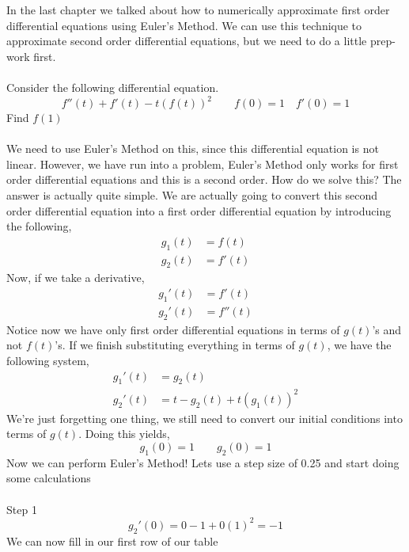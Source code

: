 \documentclass[10pt,reqno]{book}
\theoremstyle{definition}
\begin{document}
	In the last chapter we talked about how to numerically approximate first order differential equations using Euler's Method. We can use this technique to approximate second order differential equations, but we need to do a little prep-work first.\\ \\
	Consider the following differential equation.
	\[ f''(t) + f'(t) - t(f(t))^2 \qquad f(0)=1 \quad f'(0)=1 \]
	Find $ f(1) $\\ \\
	We need to use Euler's Method on this, since this differential equation is not linear. However, we have run into a problem, Euler's Method only works for first order differential equations and this is a second order. How do we solve this? The answer is actually quite simple. We are actually going to convert this second order differential equation into a first order differential equation by introducing the following,
	\begin{align*}
		g_1(t) &= f(t)\\
		g_2(t) &= f'(t)
	\end{align*}
	Now, if we take a derivative,
	\begin{align*}
		g_1'(t) &= f'(t)\\
		g_2'(t) &= f''(t)
	\end{align*}
	Notice now we have only first order differential equations in terms of $ g(t) $'s and not $ f(t) $'s. If we finish substituting everything in terms of $ g(t) $, we have the following system,
	\begin{align*}
		g_1'(t) &= g_2(t)\\
		g_2'(t) &= t - g_2(t) + t(g_1(t))^2
	\end{align*}
	We're just forgetting one thing, we still need to convert our initial conditions into terms of $ g(t) $. Doing this yields, 
	\[ g_1(0) = 1 \qquad g_2(0)=1 \]
	Now we can perform Euler's Method! Lets use a step size of 0.25 and start doing some calculations\\ \\
	Step 1
	\[ g_2'(0) = 0 - 1 + 0(1)^2 = -1 \]
	We can now fill in our first row of our table
	
\end{document}

